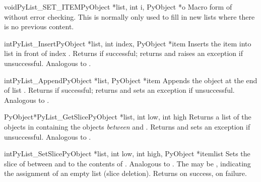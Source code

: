 \begin{cfuncdesc}{void}{PyList_SET_ITEM}{PyObject *list, int i,
                                              PyObject *o}
  Macro form of  without error checking.
  This is normally only used to fill in new lists where there is no
  previous content.
\end{cfuncdesc}

\begin{cfuncdesc}{int}{PyList_Insert}{PyObject *list, int index,
                                      PyObject *item}
  Inserts the item  into list  in front of index
  .  Returns  if successful; returns  and
  raises an exception if unsuccessful.  Analogous to
  .
\end{cfuncdesc}

\begin{cfuncdesc}{int}{PyList_Append}{PyObject *list, PyObject *item}
  Appends the object  at the end of list .
  Returns  if successful; returns  and sets an
  exception if unsuccessful.  Analogous to
  .
\end{cfuncdesc}

\begin{cfuncdesc}{PyObject*}{PyList_GetSlice}{PyObject *list,
                                              int low, int high}
  Returns a list of the objects in  containing the objects
  \emph{between}  and .  Returns \NULL{} and sets
  an exception if unsuccessful.
  Analogous to .
\end{cfuncdesc}

\begin{cfuncdesc}{int}{PyList_SetSlice}{PyObject *list,
                                        int low, int high,
                                        PyObject *itemlist}
  Sets the slice of  between  and  to the
  contents of .  Analogous to
  .
  The  may be \NULL{}, indicating the assignment
  of an empty list (slice deletion).
  Returns  on success,  on failure.
\end{cfuncdesc}

